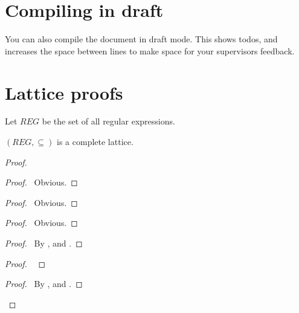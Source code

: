 
\section{Compiling in draft}\label{sec:compiling-in-draft}
You can also compile the document in draft mode.
This shows todos, and increases the space between lines to make space for your supervisors feedback.

\section{Lattice proofs}

Let $REG$ be the set of all regular expressions.

\begin{theorem}
    $(REG, \subseteq)$ is a complete lattice.
\end{theorem}

\begin{proof}
    \begin{proof}
        \pf\ Obvious.
    \end{proof}
    \begin{proof}
        \pf\ Obvious.
    \end{proof}
    \begin{proof}
        \pf\ Obvious.
    \end{proof}
    \begin{proof}
        \pf\ By ,  and .
    \end{proof}
    \begin{proof}
        \
    \end{proof}
    \qedstep{}
    \begin{proof}
        \pf\ By ,  and .
    \end{proof}
\end{proof}

